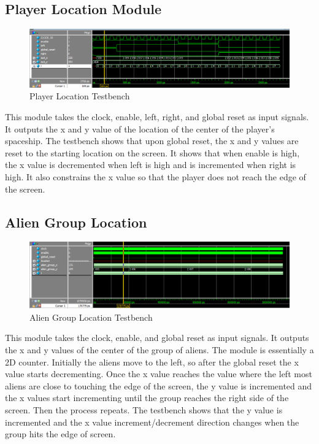 \documentclass[11pt, titlepage]{article}
\begin{document}
        \subsection{Player Location Module}
            \begin{figure}[H]
                \centering
                \includegraphics[scale = 0.53]{Images/Testbench Player Location.png}
                \caption{Player Location Testbench}
            \end{figure}
            This module takes the clock, enable, left, right, and global reset as input signals. It outputs the x and y value of the location of the center of the player's spaceship. The testbench shows that upon global reset, the x and y values are reset to the starting location on the screen. It shows that when enable is high, the x value is decremented when left is high and is incremented when right is high. It also constrains the x value so that the player does not reach the edge of the screen.

        \subsection{Alien Group Location}
            \begin{figure}[H]
                \centering
                \includegraphics[scale = 0.53]{Images/Testbench Alien Group Location.png}
                \caption{Alien Group Location Testbench}
            \end{figure}
            This module takes the clock, enable, and global reset as input signals. It outputs the x and y values of the center of the group of aliens. The module is essentially a 2D counter. Initially the aliens move to the left, so after the global reset the x value starts decrementing. Once the x value reaches the value where the left most aliens are close to touching the edge of the screen, the y value is incremented and the x values start incrementing until the group reaches the right side of the screen. Then the process repeats. The testbench shows that the y value is incremented and the x value increment/decrement direction changes when the group hits the edge of screen.
\end{document}
